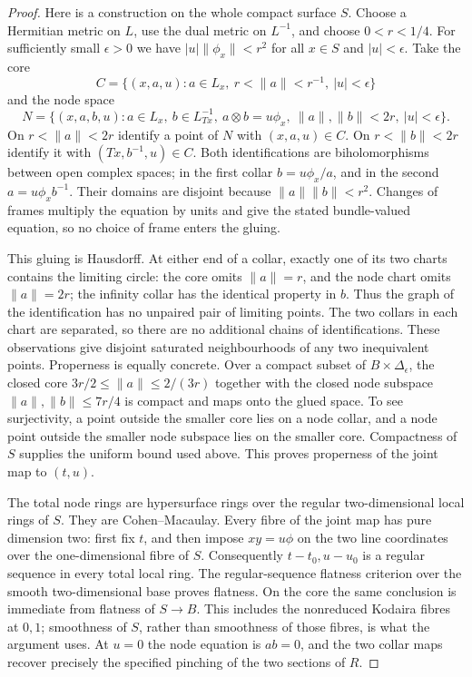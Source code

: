 \begin{proof}
Here is a construction on the whole compact surface $S$. Choose a
Hermitian metric on $L$, use the dual metric on $L^{-1}$, and choose
$0<r<1/4$. For sufficiently small $\epsilon>0$ we have
$|u|\|\phi_x\|<r^2$ for all $x\in S$ and $|u|<\epsilon$.
Take the core
\[
 C=\{(x,a,u):a\in L_x,\ r<\|a\|<r^{-1},\ |u|<\epsilon\}
\]
and the node space
\[
 N=\{(x,a,b,u):a\in L_x,\ b\in L^{-1}_{Tx},\
 a\otimes b=u\phi_x,\ \|a\|,\|b\|<2r,\ |u|<\epsilon\}.
\]
On $r<\|a\|<2r$ identify a point of $N$ with $(x,a,u)\in C$.
On $r<\|b\|<2r$ identify it with $(Tx,b^{-1},u)\in C$.
Both identifications are biholomorphisms between open complex spaces;
in the first collar $b=u\phi_x/a$, and in the second
$a=u\phi_xb^{-1}$. Their domains are disjoint because
$\|a\|\|b\|<r^2$. Changes of frames multiply the equation by
units and give the stated bundle-valued equation, so no choice of
frame enters the gluing.

This gluing is Hausdorff. At either end of a collar, exactly one
of its two charts contains the limiting circle: the core omits
$\|a\|=r$, and the node chart omits $\|a\|=2r$; the infinity
collar has the identical property in $b$. Thus the graph of the
identification has no unpaired pair of limiting points. The two
collars in each chart are separated, so there are no additional
chains of identifications. These observations give disjoint
saturated neighbourhoods of any two inequivalent points. Properness
is equally concrete. Over a compact subset of $B\times\Delta_\epsilon$,
the closed core $3r/2\leq\|a\|\leq2/(3r)$ together with the
closed node subspace $\|a\|,\|b\|\leq7r/4$ is compact and maps
onto the glued space. To see surjectivity, a point outside the smaller
core lies on a node collar, and a node point outside the smaller
node subspace lies on the smaller core. Compactness of $S$ supplies
the uniform bound used above. This proves properness of the joint
map to $(t,u)$.

The total node rings are hypersurface rings over the regular
two-dimensional local rings of $S$. They are Cohen--Macaulay.
Every fibre of the joint map has pure dimension two: first fix
$t$, and then impose $xy=u\phi$ on the two line coordinates over
the one-dimensional fibre of $S$. Consequently $t-t_0,u-u_0$ is a
regular sequence in every total local ring. The regular-sequence
flatness criterion over the smooth two-dimensional base proves
flatness. On the core the same conclusion is immediate from
flatness of $S\to B$. This includes the nonreduced Kodaira fibres
at $0,1$; smoothness of $S$, rather than smoothness of those fibres,
is what the argument uses. At $u=0$ the node equation is $ab=0$,
and the two collar maps recover precisely the specified pinching
of the two sections of $R$.


\end{proof}
